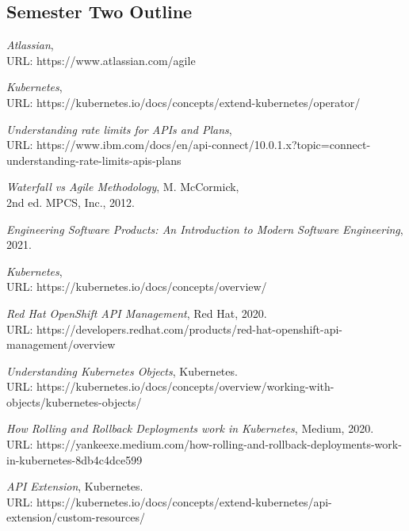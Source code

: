 \documentclass{article}
\begin{document}
\subsection{Semester Two Outline}




\clearpage
\begin{thebibliography}{9}


\emph{Atlassian}, \\URL: https://www.atlassian.com/agile 

\emph{Kubernetes}, \\URL: https://kubernetes.io/docs/concepts/extend-kubernetes/operator/

\emph{Understanding rate limits for APIs and Plans}, \\URL: https://www.ibm.com/docs/en/api-connect/10.0.1.x?topic=connect-understanding-rate-limits-apis-plans

\emph{Waterfall vs Agile Methodology}, M. McCormick, \\2nd ed. MPCS, Inc., 2012.

\emph{Engineering Software Products: An Introduction to Modern Software Engineering}, 2021.
  
\emph{Kubernetes}, \\URL: https://kubernetes.io/docs/concepts/overview/  

\emph{Red Hat OpenShift API Management}, Red Hat, 2020. \\URL: https://developers.redhat.com/products/red-hat-openshift-api-management/overview

\emph{Understanding Kubernetes Objects}, Kubernetes. \\URL: https://kubernetes.io/docs/concepts/overview/working-with-objects/kubernetes-objects/
  
\emph{How Rolling and Rollback Deployments work in Kubernetes}, Medium, 2020. \\URL: https://yankeexe.medium.com/how-rolling-and-rollback-deployments-work-in-kubernetes-8db4c4dce599 

\emph{API Extension}, Kubernetes. \\URL: https://kubernetes.io/docs/concepts/extend-kubernetes/api-extension/custom-resources/ 
  

\end{thebibliography}
\end{document}
